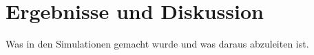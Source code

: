 \chapter{Ergebnisse und Diskussion}

Was in den Simulationen gemacht wurde und was daraus abzuleiten ist.
